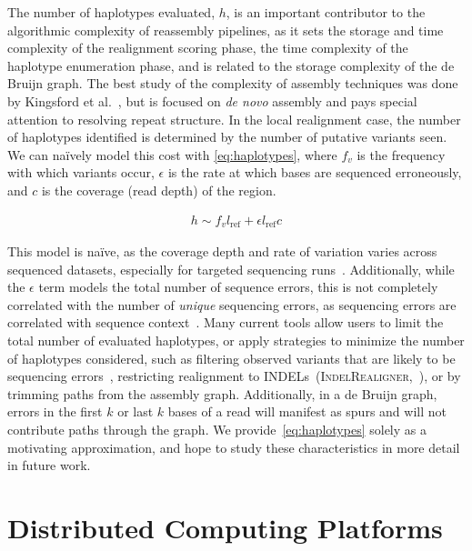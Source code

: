 \documentclass[phd]{ucbthesis}
\begin{document}
The number of haplotypes evaluated, $h$, is an important contributor to the algorithmic complexity of
reassembly pipelines, as it sets the storage and time complexity of the realignment scoring phase, the
time complexity of the haplotype enumeration phase, and is related to the storage complexity of the
de Bruijn graph. The best study of the complexity of assembly techniques was done by Kingsford
et al.~\cite{kingsford10}, but is focused on \emph{de novo} assembly and pays special attention to
resolving repeat structure. In the local realignment case, the number of haplotypes identified is determined
by the number of putative variants seen. We can na\"{i}vely model this cost with \eqref{eq:haplotypes},
where $f_v$ is the frequency with which variants occur, $\epsilon$ is the rate at which bases are
sequenced erroneously, and $c$ is the coverage (read depth) of the region.

\begin{align}
\label{eq:haplotypes}
h \sim f_v l_{\text{ref}} + \epsilon l_{\text{ref}} c
\end{align}

This model is na\"{i}ve, as the coverage depth and rate of variation varies across sequenced datasets,
especially for targeted sequencing runs~\cite{fang14}. Additionally, while the $\epsilon$ term models the
total number of sequence errors, this is not completely correlated with the number of \emph{unique}
sequencing errors, as sequencing errors are correlated with sequence context~\cite{depristo11}. Many
current tools allow users to limit the total number of evaluated haplotypes, or apply strategies to minimize
the number of haplotypes considered, such as filtering observed variants that are likely to be sequencing
errors~\cite{garrison12}, restricting realignment to INDELs~(\textsc{IndelRealigner},~\cite{depristo11}), or
by trimming paths from the assembly graph. Additionally, in a de Bruijn graph, errors in the
first $k$ or last $k$ bases of a read will manifest as spurs and will not contribute paths through the graph. We provide~\eqref{eq:haplotypes} solely as a motivating
approximation, and hope to study these characteristics in more detail in future work.

\section{Distributed Computing Platforms}
\label{sec:distributed-computing}
\end{document}
